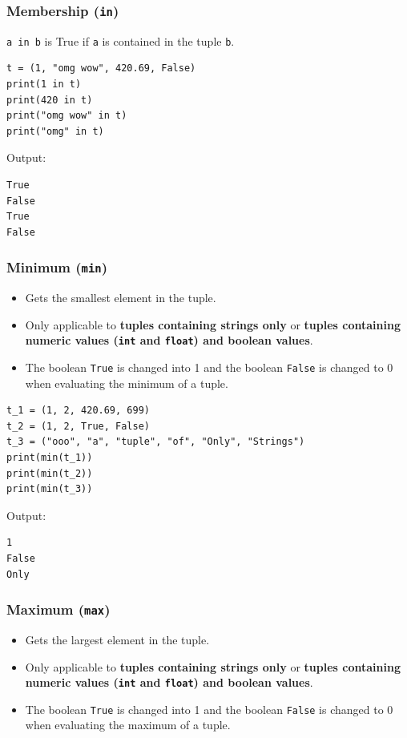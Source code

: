 \documentclass[11pt]{article}
\begin{document}
\subsubsection{Membership (\texttt{in})}
\label{sec:orgd7f875a}
\texttt{a in b} is True if \texttt{a} is contained in the tuple \texttt{b}.
\begin{verbatim}
t = (1, "omg wow", 420.69, False)
print(1 in t)
print(420 in t)
print("omg wow" in t)
print("omg" in t)
\end{verbatim}

 \noindent Output:

\begin{verbatim}
True
False
True
False
\end{verbatim}

\subsubsection{Minimum (\texttt{min})}
\label{sec:org83a36f6}
\begin{itemize}
\item Gets the smallest element in the tuple.
\item Only applicable to \textbf{tuples containing strings only} or \textbf{tuples containing numeric values (\texttt{int} and \texttt{float}) and boolean values}.
\item The boolean \texttt{True} is changed into 1 and the boolean \texttt{False} is changed to 0 when evaluating the minimum of a tuple.
\end{itemize}

\begin{verbatim}
t_1 = (1, 2, 420.69, 699)
t_2 = (1, 2, True, False)
t_3 = ("ooo", "a", "tuple", "of", "Only", "Strings")
print(min(t_1))
print(min(t_2))
print(min(t_3))
\end{verbatim}

 \noindent Output:

\begin{verbatim}
1
False
Only
\end{verbatim}

\subsubsection{Maximum (\texttt{max})}
\label{sec:orgcfd8dfc}
\begin{itemize}
\item Gets the largest element in the tuple.
\item Only applicable to \textbf{tuples containing strings only} or \textbf{tuples containing numeric values (\texttt{int} and \texttt{float}) and boolean values}.
\item The boolean \texttt{True} is changed into 1 and the boolean \texttt{False} is changed to 0 when evaluating the maximum of a tuple.
\end{itemize}
\end{document}

